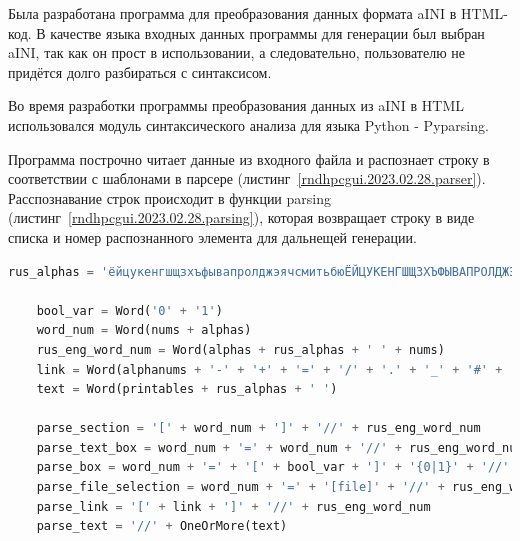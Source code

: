 \def\notedate{2023.02.28}
\def\currentauthor{Василян А.Р. (РК6-83Б)}


Была разработана программа для преобразования данных формата aINI в HTML-код. В качестве языка входных данных программы для генерации был выбран aINI, так как он прост в использовании, а следовательно, пользователю не придётся долго разбираться с синтаксисом.

Во время разработки программы преобразования данных из aINI в HTML использовался модуль синтаксического анализа для языка Python - Pyparsing. 

Программа построчно читает данные из входного файла и распознает строку в соответствии с шаблонами в парсере (листинг~\ref{rndhpcgui.2023.02.28.parser}). Расспознавание строк происходит в функции parsing (листинг~\ref{rndhpcgui.2023.02.28.parsing}), которая возвращает строку в виде списка и номер распознанного элемента для дальнещей генерации.

\begin{lstlisting}[frame=single, label={rndhpcgui.2023.02.28.parser}, caption={Парсер}, language={Python}] 
	rus_alphas = 'ёйцукенгшщзхъфывапролджэячсмитьбюЁЙЦУКЕНГШЩЗХЪФЫВАПРОЛДЖЭЯЧСМИТЬБЮ'

	bool_var = Word('0' + '1')
	word_num = Word(nums + alphas)
	rus_eng_word_num = Word(alphas + rus_alphas + ' ' + nums)
	link = Word(alphanums + '-' + '+' + '=' + '/' + '.' + '_' + '#' + ':' + '&' + '?' + '%')
	text = Word(printables + rus_alphas + ' ')
	
	parse_section = '[' + word_num + ']' + '//' + rus_eng_word_num
	parse_text_box = word_num + '=' + word_num + '//' + rus_eng_word_num
	parse_box = word_num + '=' + '[' + bool_var + ']' + '{0|1}' + '//' + rus_eng_word_num
	parse_file_selection = word_num + '=' + '[file]' + '//' + rus_eng_word_num
	parse_link = '[' + link + ']' + '//' + rus_eng_word_num
	parse_text = '//' + OneOrMore(text)
\end{lstlisting}

